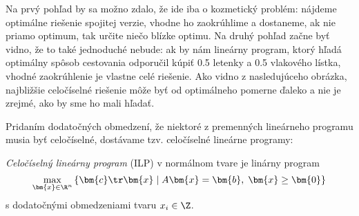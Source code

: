 \noindent Na prvý pohľad by sa možno zdalo, že ide iba o kozmetický problém:
nájdeme optimálne riešenie spojitej verzie, vhodne ho zaokrúhlime a dostaneme,
ak nie priamo optimum, tak určite niečo blízke optimu.  Na druhý pohľad začne
byť vidno, že to také jednoduché nebude: ak by nám lineárny program, ktorý
hľadá optimálny spôsob cestovania odporučil kúpiť 0.5 letenky a 0.5 vlakového
lístka, vhodné zaokrúhlenie je vlastne celé riešenie. Ako vidno z nasledujúceho
obrázka, najbližšie celočíselné riešenie môže byť od optimálneho pomerne ďaleko
a nie je zrejmé, ako by sme ho mali hľadať.

\begin{center}
\end{center}

\noindent Pridaním dodatočných obmedzení, že niektoré z premenných lineárneho
programu musia byť celočíselné, dostávame tzv. celočíselné lineárne programy:


\begin{framed}
  \begin{dfn}
    {\em Celočíselný lineárny program} (ILP) v normálnom tvare je linárny program
    $$ \max_{\bm{x}\in\R^n}\left\{ \bm{c}\tr\bm{x} \mid A\bm{x}=\bm{b},\;\bm{x}\ge\bm{0}\right\}$$
    s dodatočnými obmedzeniami tvaru $x_i\in\Z$.
  \end{dfn}
\end{framed}

